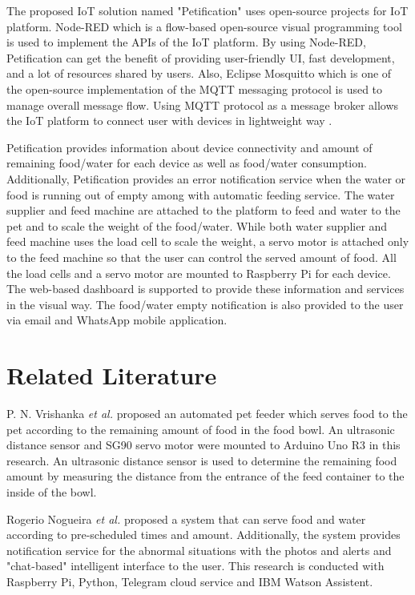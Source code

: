 \documentclass[conference]{IEEEtran}
\begin{document}
The proposed IoT solution named "Petification" uses open-source projects for IoT platform. Node-RED which is a flow-based open-source visual programming tool \cite{b8} is used to implement the APIs of the IoT platform. By using Node-RED, Petification can get the benefit of providing user-friendly UI, fast development, and a lot of resources shared by users. Also, Eclipse Mosquitto which is one of the open-source implementation of the MQTT messaging protocol is used to manage overall message flow. Using MQTT protocol as a message broker allows the IoT platform to connect user with devices in lightweight way \cite{b9}.

Petification provides information about device connectivity and amount of remaining  food/water for each device as well as food/water consumption. Additionally, Petification provides an error notification service when the water or food is running out of empty among with automatic feeding service.
The water supplier and feed machine are attached to the platform to feed and water to the pet and to scale the weight of the food/water. While both water supplier and feed machine uses the load cell to scale the weight, a servo motor is attached only to the feed machine so that the user can control the served amount of food. All the load cells and a servo motor are mounted to Raspberry Pi for each device.
The web-based dashboard is supported to provide these information and services in the visual way. The food/water empty notification is also provided to the user via email and WhatsApp mobile application.

\section{Related Literature}
P. N. Vrishanka \textit{et al.} \cite{b10} proposed an automated pet feeder which serves food to the pet according to the remaining amount of food in the food bowl. An ultrasonic distance sensor and SG90 servo motor were mounted to Arduino Uno R3 in this research. An ultrasonic distance sensor is used to determine the remaining food amount by measuring the distance from the entrance of the feed container to the inside of the bowl.

Rogerio Nogueira \textit{et al.} \cite{b11} proposed a system that can serve food and water according to pre-scheduled times and amount. Additionally, the system provides notification service for the abnormal situations with the photos and alerts and "chat-based" intelligent interface to the user. This research is conducted with Raspberry Pi, Python, Telegram cloud service and IBM Watson Assistent.
\end{document}
